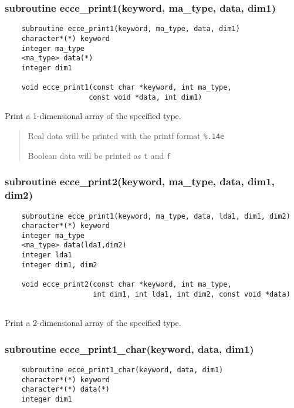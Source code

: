 \subsubsection{ subroutine ecce\_print1(keyword, ma\_type, data, dim1) }

\begin{verbatim}
    subroutine ecce_print1(keyword, ma_type, data, dim1)
    character*(*) keyword
    integer ma_type
    <ma_type> data(*)
    integer dim1

    void ecce_print1(const char *keyword, int ma_type,  
                    const void *data, int dim1)
\end{verbatim}

Print a 1-dimensional array of the specified type.  

    \begin{quotation}

      Real data will be printed with the printf format \verb+%.14e+

      Boolean data will be printed as \verb+t+ and \verb+f+

     \end{quotation}

\subsubsection{ subroutine ecce\_print2(keyword, ma\_type, data, dim1, dim2)}

\begin{verbatim}
    subroutine ecce_print1(keyword, ma_type, data, lda1, dim1, dim2)
    character*(*) keyword
    integer ma_type
    <ma_type> data(lda1,dim2)
    integer lda1
    integer dim1, dim2

    void ecce_print2(const char *keyword, int ma_type, 
                     int dim1, int lda1, int dim2, const void *data)
                    
\end{verbatim}

Print a 2-dimensional array of the specified type.  

\subsubsection{ subroutine ecce\_print1\_char(keyword, data, dim1) }

\begin{verbatim}
    subroutine ecce_print1_char(keyword, data, dim1)
    character*(*) keyword
    character*(*) data(*)
    integer dim1
\end{verbatim}

